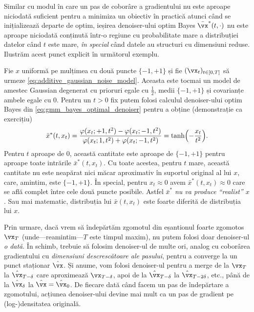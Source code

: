 \documentclass[../../book-main_ro.tex]{subfiles}
\begin{document}
Similar cu modul în care un pas de coborâre a gradientului nu este aproape niciodată suficient pentru a minimiza un obiectiv în practică atunci când se inițializează departe de optim, ieșirea denoiser-ului optim Bayes \(\bar{\vx}^{\ast}(t, \cdot)\) nu este aproape niciodată conținută într-o regiune cu probabilitate mare a distribuției datelor când \(t\) este mare, \textit{în special} când datele au structuri cu dimensiuni reduse. Ilustrăm acest punct explicit în următorul exemplu.
\begin{example}\label{example:denoising_twopoints}
	Fie \(x\) uniformă pe mulțimea cu două puncte \(\{-1, +1\}\) și fie \((\vx_{t})_{t \in [0, T]}\) să urmeze \eqref{eq:additive_gaussian_noise_model}. Aceasta este tocmai un model de amestec Gaussian degenerat cu prioruri egale cu \(\frac{1}{2}\), medii \(\{-1, +1\}\) și covarianțe ambele egale cu \(0\). Pentru un \(t > 0\) fix putem folosi calculul denoiser-ului optim Bayes din \eqref{eq:gmm_bayes_optimal_denoiser} pentru a obține (demonstrație ca exercițiu)
	\begin{equation}
		\bar{x}^{\ast}(t, x_{t}) = \frac{\phi(x_{t} ; +1, t^{2}) - \phi(x_{t}
		; -1, t^{2})}{\phi(x_{t} ; 1, t^{2}) + \phi(x_{t} ; -1, t^{2})} = \tanh\rp{-\frac{x_{t}}{t^{2}}}.
	\end{equation}
	Pentru \(t\) aproape de \(0\), această cantitate este aproape de \(\{-1, +1\}\) pentru aproape toate intrările \(\bar{x}^{\ast}(t, x_{t})\). Cu toate acestea, pentru \(t\) mare, această cantitate nu este neapărat nici măcar aproximativ în suportul original al lui \(x\), care, amintim, este \(\{-1, +1\}\). În special, pentru \(x_{t} \approx 0\) avem \(\bar{x}^{\ast}(t, x_{t}) \approx 0\) care se află complet între cele două puncte posibile. Astfel \(\bar{x}^{\ast}\) \textit{nu va produce ``realist'' \(x\)}. Sau mai matematic, distribuția lui \(\bar{x}(t, x_{t})\) este foarte diferită de distribuția lui \(x\).
\end{example}

Prin urmare, dacă vrem să îndepărtăm zgomotul din eșantionul foarte zgomotos \(\vx_{T}\) (unde—reamintim—\(T\) este timpul maxim), nu putem folosi doar denoiser-ul \textit{o dată}. În schimb, trebuie să folosim denoiser-ul de multe ori, analog cu coborârea gradientului cu \textit{dimensiuni descrescătoare ale pasului}, pentru a converge la un punct staționar \(\hat{\vx}\). Și anume, vom folosi denoiser-ul pentru a merge de la \(\vx_{T}\) la \(\hat{\vx}_{T - \delta}\) care aproximează \(\vx_{T - \delta}\), apoi de la \(\hat{\vx}_{T - \delta}\) la \(\hat{\vx}_{T - 2\delta}\), etc., până de la \(\hat{\vx}_{\delta}\) la \(\hat{\vx} = \hat{\vx}_{0}\). De fiecare dată când facem un pas de îndepărtare a zgomotului, acțiunea denoiser-ului devine mai mult ca un pas de gradient pe (log-)densitatea originală.
\end{document}
